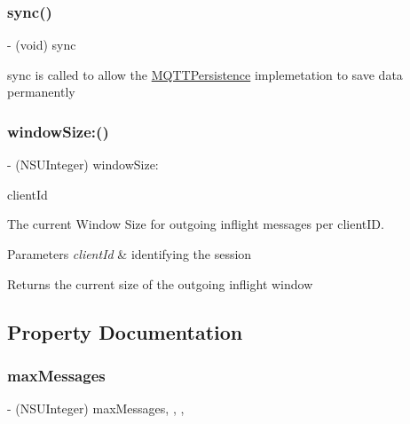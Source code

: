 \subsubsection{\texorpdfstring{sync()}{sync()}}
{\footnotesize\ttfamily -\/ (void) sync \begin{DoxyParamCaption}{ }\end{DoxyParamCaption}}

sync is called to allow the \hyperlink{protocol_m_q_t_t_persistence-p}{M\+Q\+T\+T\+Persistence} implemetation to save data permanently \mbox{\label{protocol_m_q_t_t_persistence-p_a8521b079578db32e593d841ce2941fc0}} 
\subsubsection{\texorpdfstring{window\+Size\+:()}{windowSize:()}}
{\footnotesize\ttfamily -\/ (N\+S\+U\+Integer) window\+Size\+: \begin{DoxyParamCaption}\item[{(N\+S\+String $\ast$)}]{client\+Id }\end{DoxyParamCaption}}

The current Window Size for outgoing inflight messages per client\+ID. 
\begin{DoxyParams}{Parameters}
{\em client\+Id} & identifying the session \\
\hline
\end{DoxyParams}
\begin{DoxyReturn}{Returns}
the current size of the outgoing inflight window 
\end{DoxyReturn}


\subsection{Property Documentation}
\mbox{\label{protocol_m_q_t_t_persistence-p_a25da1e10303f72b9f5c0acded51780d2}} 
\subsubsection{\texorpdfstring{max\+Messages}{maxMessages}}
{\footnotesize\ttfamily -\/ (N\+S\+U\+Integer) max\+Messages\hspace{0.3cm}{\ttfamily [read]}, {\ttfamily [write]}, {\ttfamily [nonatomic]}, {\ttfamily [assign]}}

